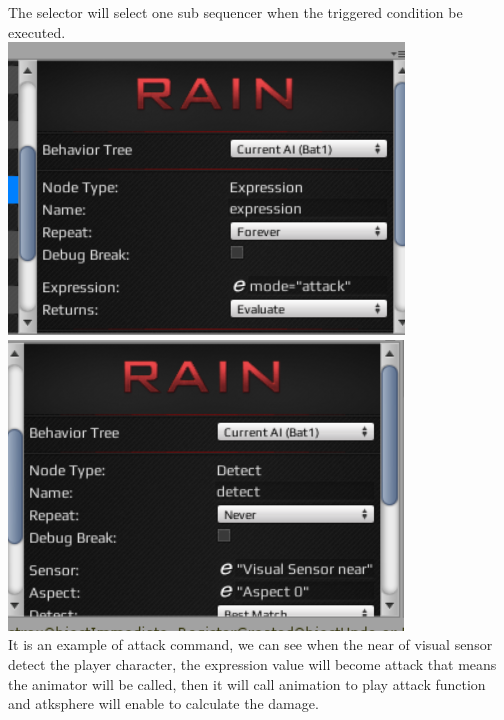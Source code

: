 \begin{itemize}
The selector will select one sub sequencer when the triggered condition be executed.\\
\includegraphics[scale=0.5]{img/RainSelect.png}\\
\includegraphics[scale=0.5]{img/RainSelectD.png}\\
It is an example of attack command, we can see when the near of visual sensor detect the player character, the expression value will become attack that means the animator will be called, then it will call animation to play attack function and atksphere will enable to calculate the damage.
\end{itemize}

